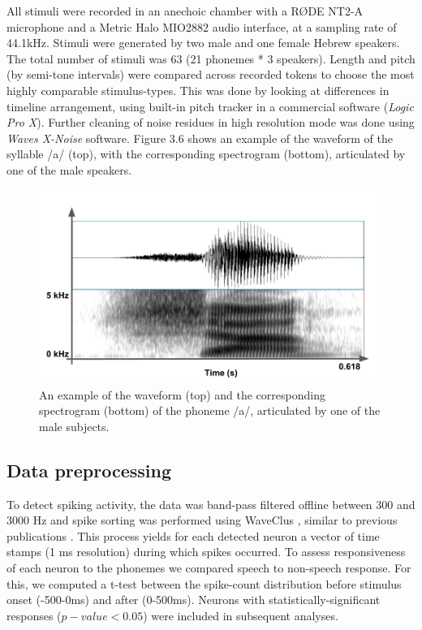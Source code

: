 All stimuli were recorded in an anechoic chamber with a RØDE NT2-A microphone and a Metric Halo MIO2882 audio interface, at a sampling rate of 44.1kHz. Stimuli were generated by two male and one female Hebrew speakers. The total number of stimuli was 63 (21 phonemes * 3 speakers). Length and pitch (by semi-tone intervals) were compared across recorded tokens to choose the most highly comparable stimulus-types. This was done by looking at differences in timeline arrangement, using built-in pitch tracker in a commercial software (\textit{Logic Pro X}). Further cleaning of noise residues in high resolution mode was done using \textit{Waves X-Noise} software. Figure 3.6 shows an example of the waveform of the syllable /a/ (top), with the corresponding spectrogram (bottom), articulated by one of the male speakers. 

\begin{figure}[h]
\vspace{.3in}
\includegraphics[width=\linewidth]{Figures/Ch3/spectrogram_sha.png}
\caption{An example of the waveform (top) and the corresponding spectrogram (bottom) of the phoneme /a/, articulated by one of the male subjects.}
\end{figure}

\subsection{Data preprocessing}
To detect spiking activity, the data was band-pass filtered offline between 300 and 3000 Hz and spike sorting was performed using WaveClus \citep{quiroga2004unsupervised}, similar to previous publications \citep{quiroga2005invariant}. This process yields for each detected neuron a vector of time stamps (1 ms resolution) during which spikes occurred. To assess responsiveness of each neuron to the phonemes we compared speech to non-speech response. For this, we computed a t-test between the spike-count distribution before stimulus onset (-500-0ms) and after (0-500ms). Neurons with statistically-significant responses ($p-value<0.05$) were included in subsequent analyses. 

